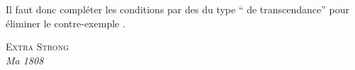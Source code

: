Il faut donc compléter les conditions   par des   du type `` de transcendance'' pour éliminer le contre-exemple .

{\centering \textsc{Extra Strong}\\
\textit{Ma 1808}\par}
